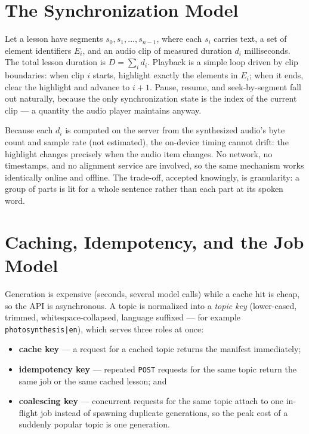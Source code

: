 \section{The Synchronization Model}
\label{sec:syncmethod}

Let a lesson have segments $s_0, s_1, \ldots, s_{n-1}$, where each $s_i$
carries text, a set of element identifiers $E_i$, and an audio clip of
measured duration $d_i$ milliseconds. The total lesson duration is
$D=\sum_{i} d_i$. Playback is a simple loop driven by clip boundaries: when
clip $i$ starts, highlight exactly the elements in $E_i$; when it ends, clear
the highlight and advance to $i+1$. Pause, resume, and seek-by-segment fall
out naturally, because the only synchronization state is the index of the
current clip --- a quantity the audio player maintains anyway.

Because each $d_i$ is computed on the server from the synthesized audio's
byte count and sample rate (not estimated), the on-device timing cannot
drift: the highlight changes precisely when the audio item changes. No
network, no timestamps, and no alignment service are involved, so the same
mechanism works identically online and offline. The trade-off, accepted
knowingly, is granularity: a group of parts is lit for a whole sentence
rather than each part at its spoken word.

\section{Caching, Idempotency, and the Job Model}
\label{sec:cachemethod}

Generation is expensive (seconds, several model calls) while a cache hit is
cheap, so the API is asynchronous. A topic is normalized into a
\emph{topic key} (lower-cased, trimmed, whitespace-collapsed, language
suffixed --- for example \texttt{photosynthesis|en}), which serves three
roles at once:

\begin{itemize}
  \item \textbf{cache key} --- a request for a cached topic returns the
        manifest immediately;
  \item \textbf{idempotency key} --- repeated \texttt{POST} requests for the
        same topic return the same job or the same cached lesson; and
  \item \textbf{coalescing key} --- concurrent requests for the same topic
        attach to one in-flight job instead of spawning duplicate
        generations, so the peak cost of a suddenly popular topic is one
        generation.
\end{itemize}

